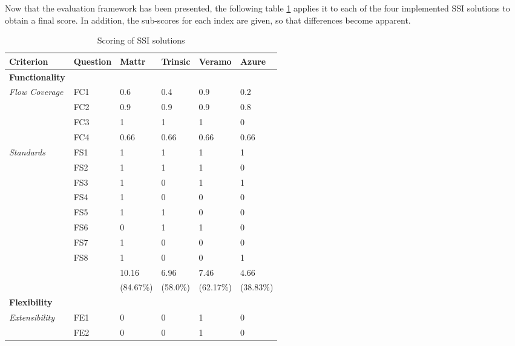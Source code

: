     Now that the evaluation framework has been presented, the following table \ref{tab: scores} applies it to each of the four implemented \ac{SSI} solutions to obtain a final score. In addition, the sub-scores for each index are given, so that differences become apparent. 

    \setlength\LTleft{0pt}
    \setlength\LTright{0pt}
    \begin{longtable}{@{\extracolsep{\fill}}llllll@{}}
        \caption{Scoring of \ac{SSI} solutions}
        \label{tab: scores}\\
        \toprule
        \textbf{Criterion}     & \textbf{Question} & \textbf{Mattr} & \textbf{Trinsic} & \textbf{Veramo} & \textbf{Azure} \\ \midrule
        \endfirsthead\endhead\endfoot\endlastfoot
        \textbf{Functionality} &&&&&\\
        \textit{Flow Coverage} & FC1 & 0.6 & 0.4 & 0.9 & 0.2 \\
                               & FC2 & 0.9 & 0.9 & 0.9 & 0.8 \\
                               & FC3 & 1 & 1 & 1 & 0 \\
                               & FC4 & 0.66 & 0.66 & 0.66 & 0.66 \\
        \textit{Standards}     & FS1 & 1 & 1 & 1 & 1 \\
                               & FS2 & 1 & 1 & 1 & 0 \\
                               & FS3 & 1 & 0 & 1 & 1 \\
                               & FS4 & 1 & 0 & 0 & 0 \\
                               & FS5 & 1 & 1 & 0 & 0 \\
                               & FS6 & 0 & 1 & 1 & 0 \\
                               & FS7 & 1 & 0 & 0 & 0 \\
                               & FS8 & 1 & 0 & 0 & 1 \\
                               \hline
                               && 10.16 & 6.96 & 7.46 & 4.66\\
                               && (84.67\%) & (58.0\%) & (62.17\%) & (38.83\%) \\                               
                               \midrule
        \textbf{Flexibility} &&&&&\\
        \textit{Extensibility} & FE1 & 0 & 0 & 1 & 0 \\
                               & FE2 & 0 & 0 & 1 & 0 \\

\end{longtable}
